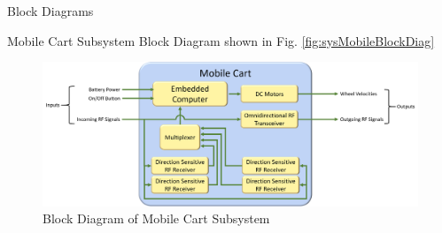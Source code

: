 \documentclass{beamer}
\begin{document}

\begin{frame}{Block Diagrams}
  \begin{block}{}
    Mobile Cart Subsystem Block Diagram shown in Fig. \autoref{fig:sysMobileBlockDiag}
  \end{block}
  \begin{figure}[b]
    \centering
    \includegraphics[width=\textwidth]{figs/img/mobileCartBlockDiagram.png}
    \caption{Block Diagram of Mobile Cart Subsystem}
    \label{fig:sysMobileBlockDiag}
  \end{figure}
\end{frame}

\end{document}
